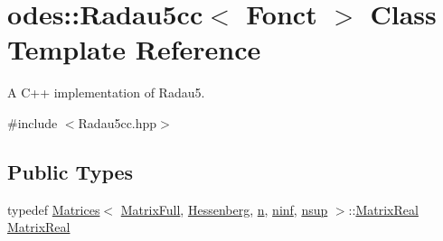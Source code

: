 \hypertarget{classodes_1_1Radau5cc}{}\section{odes\+:\+:Radau5cc$<$ Fonct $>$ Class Template Reference}
\label{classodes_1_1Radau5cc}


A C++ implementation of Radau5.  




{\ttfamily \#include $<$Radau5cc.\+hpp$>$}

\subsection*{Public Types}
\begin{DoxyCompactItemize}
\item 
typedef \hyperlink{classodes_1_1Matrices}{Matrices}$<$ \hyperlink{classodes_1_1Radau5cc_a8e67471bdbf858fff865561d859a066a}{Matrix\+Full}, \hyperlink{classodes_1_1Radau5cc_ae66683695f55d21d7c11ca7e3323d0e9}{Hessenberg}, \hyperlink{classodes_1_1Radau5cc_a3be3f05d2cdf7268e7d09b62ad9ad494}{n}, \hyperlink{classodes_1_1Radau5cc_ac47e67a43369971eeb08c2d2200a76d5}{ninf}, \hyperlink{classodes_1_1Radau5cc_a4e80b8064e4d8f60262591531fcd1ff0}{nsup} $>$\+::\hyperlink{classodes_1_1Radau5cc_a8ef067b8852403d48d8528f601a4626a}{Matrix\+Real} \hyperlink{classodes_1_1Radau5cc_a8ef067b8852403d48d8528f601a4626a}{Matrix\+Real}
\end{DoxyCompactItemize}
